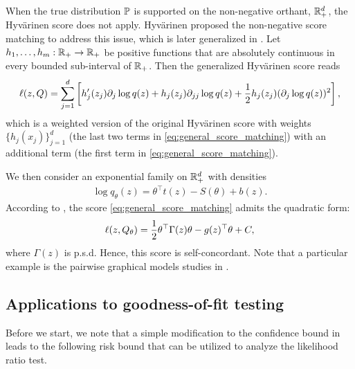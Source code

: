 \begin{example}
    When the true distribution $\operatorname{\mathbb P}$ is supported on the non-negative orthant, ${\mathbb R}^d_+$, the Hyv\"arinen score does not apply.
    Hyv\"arinen \citep{hyvarinen2007some} proposed the non-negative score matching to address this issue, which is later generalized in \cite[Section 2.2]{yu2019generalized}.
    Let $h_1, \dots, h_m: {\mathbb R}_+ \to {\mathbb R}_+$ be positive functions that are absolutely continuous in every bounded sub-interval of ${\mathbb R}_+$.
    Then the generalized Hyv\"arinen score reads
    \begin{align}\label{eq:general_score_matching}
        \ell(z, Q) = \sum_{j=1}^d \left[ h_j'(z_j) \partial_j \log{q(z)} + h_j(z_j) \partial_{jj} \log{q(z)} + \frac12 h_j(z_j) (\partial_j \log{q(z)})^2 \right],
    \end{align}
    which is a weighted version of the original Hyv\"arinen score with weights $\{h_j(x_j)\}_{j=1}^d$ (the last two terms in \eqref{eq:general_score_matching}) with an additional term (the first term in \eqref{eq:general_score_matching}).
    
    We then consider an exponential family on ${\mathbb R}_+^d$ with densities
    \begin{align*}
        \log{q_\theta(z)} = \theta^\top t(z) - S(\theta) + b(z).
    \end{align*}
    According to \cite[Theorem 5]{yu2019generalized}, the score \eqref{eq:general_score_matching} admits the quadratic form:
    \begin{align*}
        \ell(z, Q_\theta) = \frac12 \theta^\top \Gamma(z) \theta - g(z)^\top \theta + C,
    \end{align*}
    where $\Gamma(z)$ is p.s.d.
    Hence, this score is self-concordant.
    Note that a particular example is the pairwise graphical models studies in \citep{yu2016statistical,yu2020simultaneous}.
\end{example}

\subsection{Applications to goodness-of-fit testing}
\label{sub:appendix:application}

Before we start, we note that a simple modification to the confidence bound in  leads to the following risk bound that can be utilized to analyze the likelihood ratio test.

